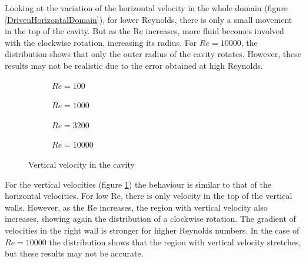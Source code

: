Looking at the variation of the horizontal velocity in the whole domain (figure \ref{DrivenHorizontalDomain}), for lower Reynolds, there is only a small movement in the top of the cavity. But as the Re increases, more fluid becomes involved with the clockwise rotation, increasing its radius. For $Re=10000$, the distribution shows that only the outer radius of the cavity rotates. However, these results may not be realistic due to the error obtained at high Reynolds.

\begin{figure}[h]
	\centering
	\begin{subfigure}{0.5\textwidth}
		\resizebox{1.4\textwidth}{!}{}
		\caption{$Re=100$}
	\end{subfigure}%
	\begin{subfigure}{0.5\textwidth}
		\resizebox{1.4\textwidth}{!}{}
		\caption{$Re=1000$}
	\end{subfigure}
	\begin{subfigure}{0.5\textwidth}
		\resizebox{1.4\textwidth}{!}{}
		\caption{$Re=3200$}
	\end{subfigure}%
	\begin{subfigure}{0.5\textwidth}
		\resizebox{1.4\textwidth}{!}{}
		\caption{$Re=10000$}
	\end{subfigure}
	\caption{Vertical velocity in the cavity}
	\label{DrivenVerticalDomain}
\end{figure}

For the vertical velocities (figure \ref{DrivenVerticalDomain}) the behaviour is similar to that of the horizontal velocities. For low Re, there is only velocity in the top of the vertical walls. However, as the Re increases, the region with vertical velocity also increases, showing again the distribution of a clockwise rotation. The gradient of velocities in the right wall is stronger for higher Reynolds numbers. In the case of $Re=10000$ the distribution shows that the region with vertical velocity stretches, but these results may not be accurate.

